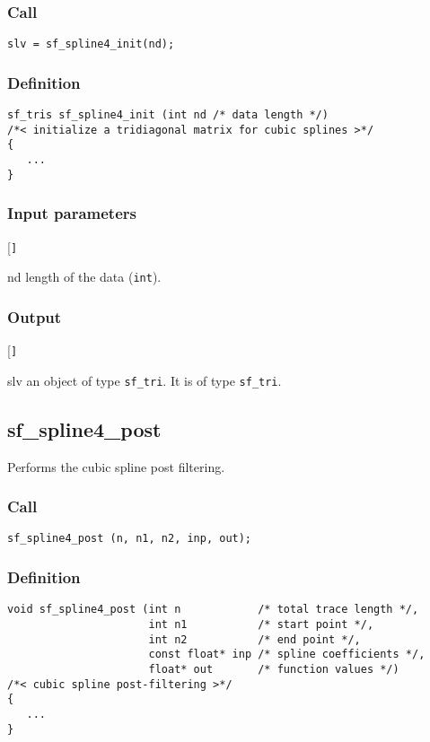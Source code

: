 \subsubsection*{Call}
\begin{verbatim}slv = sf_spline4_init(nd);\end{verbatim}

\subsubsection*{Definition}
\begin{verbatim}
sf_tris sf_spline4_init (int nd /* data length */)
/*< initialize a tridiagonal matrix for cubic splines >*/
{
   ...
}
\end{verbatim}

\subsubsection*{Input parameters}
\begin{desclist}{\tt }{\quad}[\tt ]
   \setlength\itemsep{0pt}
   \item[nd] length of the data (\texttt{int}).  
\end{desclist}

\subsubsection*{Output}
\begin{desclist}{\tt }{\quad}[\tt ]
   \setlength\itemsep{0pt}
   \item[slv] an object of type \texttt{sf\_tri}. It is of type \texttt{sf\_tri}.
\end{desclist}




\subsection{{sf\_spline4\_post}}
Performs the cubic spline post filtering.

\subsubsection*{Call}
\begin{verbatim}sf_spline4_post (n, n1, n2, inp, out);\end{verbatim}

\subsubsection*{Definition}
\begin{verbatim}
void sf_spline4_post (int n            /* total trace length */, 
                      int n1           /* start point */, 
                      int n2           /* end point */, 
                      const float* inp /* spline coefficients */, 
                      float* out       /* function values */)
/*< cubic spline post-filtering >*/
{
   ...
}
\end{verbatim}

